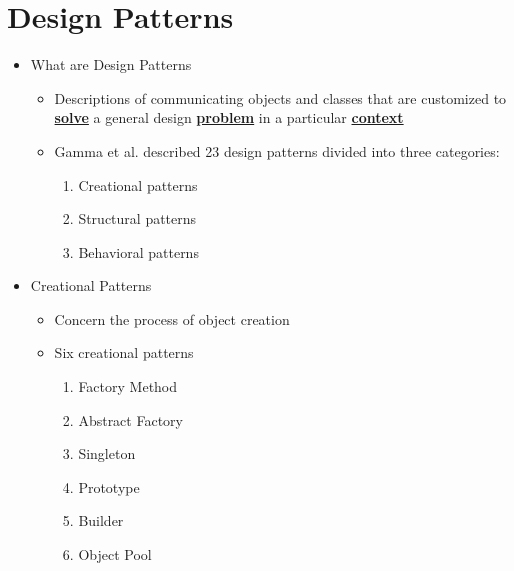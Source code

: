 \documentclass[11pt]{article}
\begin{document}
\section{Design Patterns}
\begin{itemize}
	\item What are Design Patterns
		\begin{itemize}
			\item Descriptions of communicating objects and classes that are customized to \textbf{\underline{solve}} a general design \textbf{\underline{problem}} in a particular \textbf{\underline{context}}
			\item 	Gamma et al. described 23 design patterns divided into three categories:
				\begin{enumerate}
					\item Creational patterns
					\item Structural patterns
					\item Behavioral patterns
				\end{enumerate}
		\end{itemize}

	\item Creational Patterns
		\begin{itemize}
			\item Concern the process of object creation
			\item Six creational patterns\\[-10pt]
				\begin{minipage}[t]{0.25\textwidth}
					\begin{enumerate}
						\item Factory Method
						\item Abstract Factory
						\item Singleton
					\end{enumerate}
				\end{minipage}
				\begin{minipage}[t]{0.4\textwidth}
					\begin{enumerate}
						\setcounter{enumi}{3}
						\item Prototype
						\item Builder
						\item Object Pool
					\end{enumerate}
				\end{minipage}
		\end{itemize}


\end{itemize}
\end{document}
